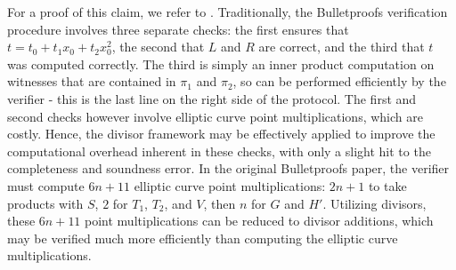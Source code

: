 \documentclass[11pt,letterpaper]{article}
\newcommand{\free}[1]{{\textcolor{red}{#1}}}
\theoremstyle{definition}
\newcommand{\6}{\mathbf}
\newcommand{\7}{\mathcal}
\newcommand{\ip}[2]{{\langle {#1}, \, {#2} \rangle}}
\begin{document}
For a proof of this claim, we refer to \cite{Bullet}.
Traditionally, the Bulletproofs verification procedure involves three separate checks: the first ensures that $t = t_0 + t_1 x_0 + t_2 x_0^2$, the second that $L$ and $R$ are correct, and the third that $t$ was computed correctly.
The third is simply an inner product computation on witnesses that are contained in $\pi_1$ and $\pi_2$, so can be performed efficiently by the verifier - this is the last line on the right side of the protocol. 
The first and second checks however involve elliptic curve point multiplications, which are costly. 
Hence, the divisor framework may be effectively applied to improve the computational overhead inherent in these checks, with only a slight hit to the completeness and soundness error.
In the original Bulletproofs paper, the verifier must compute $6n+11$ elliptic curve point multiplications: $2n+1$ to take products with $S$, $2$ for $T_1$, $T_2$, and $V$, then $n$ for $G$ and $H'$.
Utilizing divisors, these $6n+11$ point multiplications can be reduced to divisor additions, which may be verified much more efficiently than computing the elliptic curve multiplications.














        
\end{document}

